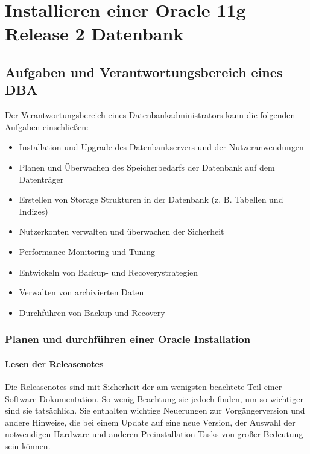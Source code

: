 \chapter{Installieren einer Oracle 11g Release 2 Datenbank}
  \chaptertoc{}
  \cleardoubleevenpage
  
      \section{Aufgaben und Verantwortungsbereich eines DBA}
      Der Verantwortungsbereich eines Datenbankadministrators kann die folgenden Aufgaben einschließen:
      \begin{itemize}
        \item Installation und Upgrade des Datenbankservers und der Nutzeranwendungen
        \item Planen und Überwachen des Speicherbedarfs der Datenbank auf dem Datenträger
        \item Erstellen von Storage Strukturen in der Datenbank (z. B. Tabellen und Indizes)
        \item Nutzerkonten verwalten und überwachen der Sicherheit
        \item Performance Monitoring und Tuning
        \item Entwickeln von Backup- und Recoverystrategien
        \item Verwalten von archivierten Daten
        \item Durchführen von Backup und Recovery
      \end{itemize}
      \subsection{Planen und durchführen einer Oracle Installation}
        \subsubsection{Lesen der Releasenotes}
          Die Releasenotes sind mit Sicherheit der am wenigsten beachtete Teil einer Software Dokumentation. So wenig Beachtung sie jedoch finden, um so wichtiger sind sie tatsächlich. Sie enthalten wichtige Neuerungen zur Vorgängerversion und andere Hinweise, die bei einem Update auf eine neue Version, der Auswahl der notwendigen Hardware und anderen Preinstallation Tasks von großer Bedeutung sein können.

          \begin{literaturinternet}
            \item \cite{e23557}
            \item \cite{e23558}
          \end{literaturinternet}

